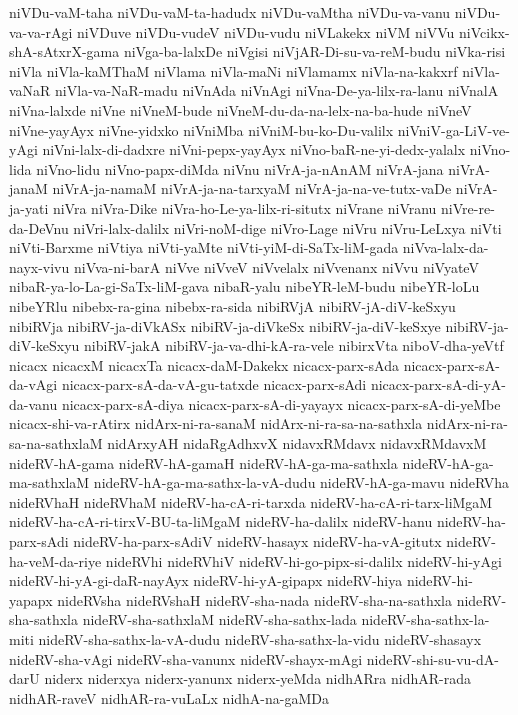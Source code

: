 {niVDu-vaM-taha
niVDu-vaM-ta-hadudx
niVDu-vaMtha
niVDu-va-vanu
niVDu-va-va-rAgi
niVDuve
niVDu-vudeV
niVDu-vudu
niVLakekx
niVM
niVVu
niVcikx-shA-sAtxrX-gama
niVga-ba-lalxDe
niVgisi
niVjAR-Di-su-va-reM-budu
niVka-risi
niVla
niVla-kaMThaM
niVlama
niVla-maNi
niVlamamx
niVla-na-kakxrf
niVla-vaNaR
niVla-va-NaR-madu
niVnAda
niVnAgi
niVna-De-ya-lilx-ra-lanu
niVnalA
niVna-lalxde
niVne
niVneM-bude
niVneM-du-da-na-lelx-na-ba-hude
niVneV
niVne-yayAyx
niVne-yidxko
niVniMba
niVniM-bu-ko-Du-valilx
niVniV-ga-LiV-ve-yAgi
niVni-lalx-di-dadxre
niVni-pepx-yayAyx
niVno-baR-ne-yi-dedx-yalalx
niVno-lida
niVno-lidu
niVno-papx-diMda
niVnu
niVrA-ja-nAnAM
niVrA-jana
niVrA-janaM
niVrA-ja-namaM
niVrA-ja-na-tarxyaM
niVrA-ja-na-ve-tutx-vaDe
niVrA-ja-yati
niVra
niVra-Dike
niVra-ho-Le-ya-lilx-ri-situtx
niVrane
niVranu
niVre-re-da-DeVnu
niVri-lalx-dalilx
niVri-noM-dige
niVro-Lage
niVru
niVru-LeLxya
niVti
niVti-Barxme
niVtiya
niVti-yaMte
niVti-yiM-di-SaTx-liM-gada
niVva-lalx-da-nayx-vivu
niVva-ni-barA
niVve
niVveV
niVvelalx
niVvenanx
niVvu
niVyateV
nibaR-ya-lo-La-gi-SaTx-liM-gava
nibaR-yalu
nibeYR-leM-budu
nibeYR-loLu
nibeYRlu
nibebx-ra-gina
nibebx-ra-sida
nibiRVjA
nibiRV-jA-diV-keSxyu
nibiRVja
nibiRV-ja-diVkASx
nibiRV-ja-diVkeSx
nibiRV-ja-diV-keSxye
nibiRV-ja-diV-keSxyu
nibiRV-jakA
nibiRV-ja-va-dhi-kA-ra-vele
nibirxVta
niboV-dha-yeVtf
nicacx
nicacxM
nicacxTa
nicacx-daM-Dakekx
nicacx-parx-sAda
nicacx-parx-sA-da-vAgi
nicacx-parx-sA-da-vA-gu-tatxde
nicacx-parx-sAdi
nicacx-parx-sA-di-yA-da-vanu
nicacx-parx-sA-diya
nicacx-parx-sA-di-yayayx
nicacx-parx-sA-di-yeMbe
nicacx-shi-va-rAtirx
nidArx-ni-ra-sanaM
nidArx-ni-ra-sa-na-sathxla
nidArx-ni-ra-sa-na-sathxlaM
nidArxyAH
nidaRgAdhxvX
nidavxRMdavx
nidavxRMdavxM
nideRV-hA-gama
nideRV-hA-gamaH
nideRV-hA-ga-ma-sathxla
nideRV-hA-ga-ma-sathxlaM
nideRV-hA-ga-ma-sathx-la-vA-dudu
nideRV-hA-ga-mavu
nideRVha
nideRVhaH
nideRVhaM
nideRV-ha-cA-ri-tarxda
nideRV-ha-cA-ri-tarx-liMgaM
nideRV-ha-cA-ri-tirxV-BU-ta-liMgaM
nideRV-ha-dalilx
nideRV-hanu
nideRV-ha-parx-sAdi
nideRV-ha-parx-sAdiV
nideRV-hasayx
nideRV-ha-vA-gitutx
nideRV-ha-veM-da-riye
nideRVhi
nideRVhiV
nideRV-hi-go-pipx-si-dalilx
nideRV-hi-yAgi
nideRV-hi-yA-gi-daR-nayAyx
nideRV-hi-yA-gipapx
nideRV-hiya
nideRV-hi-yapapx
nideRVsha
nideRVshaH
nideRV-sha-nada
nideRV-sha-na-sathxla
nideRV-sha-sathxla
nideRV-sha-sathxlaM
nideRV-sha-sathx-lada
nideRV-sha-sathx-la-miti
nideRV-sha-sathx-la-vA-dudu
nideRV-sha-sathx-la-vidu
nideRV-shasayx
nideRV-sha-vAgi
nideRV-sha-vanunx
nideRV-shayx-mAgi
nideRV-shi-su-vu-dA-darU
niderx
niderxya
niderx-yanunx
niderx-yeMda
nidhARra
nidhAR-rada
nidhAR-raveV
nidhAR-ra-vuLaLx
nidhA-na-gaMDa
}
